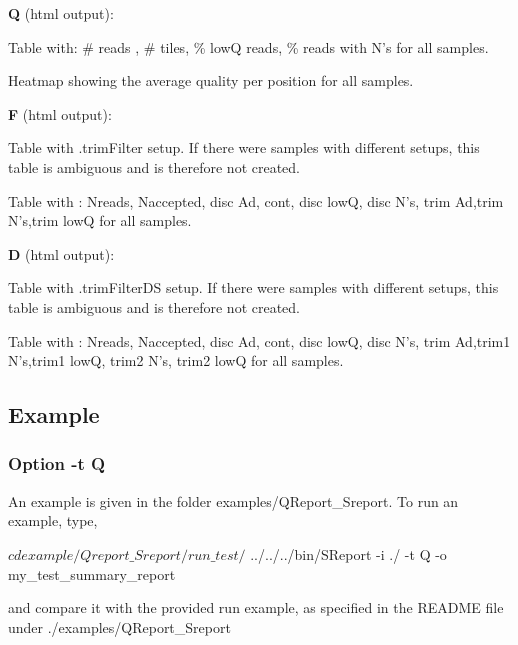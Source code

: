\begin{DoxyItemize}
\item {\bfseries Q} (html output)\+:
\begin{DoxyItemize}
\item Table with\+: {\ttfamily \# reads , \# tiles, \% lowQ reads, \% reads with N’s} for all samples.
\item Heatmap showing the average quality per position for all samples.
\end{DoxyItemize}
\item {\bfseries F} (html output)\+:
\begin{DoxyItemize}
\item Table with .trim\+Filter setup. If there were samples with different setups, this table is ambiguous and is therefore not created.
\item Table with \+: {\ttfamily Nreads}, {\ttfamily Naccepted}, {\ttfamily disc Ad}, {\ttfamily cont}, {\ttfamily disc lowQ}, {\ttfamily disc N’s}, {\ttfamily trim Ad},{\ttfamily trim N’s},{\ttfamily trim lowQ} for all samples.
\end{DoxyItemize}
\item {\bfseries D} (html output)\+:
\begin{DoxyItemize}
\item Table with .trim\+Filter\+DS setup. If there were samples with different setups, this table is ambiguous and is therefore not created.
\item Table with \+: {\ttfamily Nreads}, {\ttfamily Naccepted}, {\ttfamily disc Ad}, {\ttfamily cont}, {\ttfamily disc lowQ}, {\ttfamily disc N’s}, {\ttfamily trim Ad},{\ttfamily trim1 N’s},{\ttfamily trim1 lowQ}, {\ttfamily trim2 N’s}, {\ttfamily trim2 lowQ} for all samples.
\end{DoxyItemize}
\end{DoxyItemize}

\subsection*{Example}

\subsubsection*{Option {\ttfamily -\/t Q}}

An example is given in the folder {\ttfamily examples/\+Q\+Report\+\_\+\+Sreport}. To run an example, type,


\begin{DoxyCode}
$ cd example/Qreport\_Sreport/run\_test/
$ ../../../bin/SReport -i ./ -t Q -o my\_test\_summary\_report
\end{DoxyCode}
 and compare it with the provided run example, as specified in the R\+E\+A\+D\+ME file under {\ttfamily ./examples/\+Q\+Report\+\_\+\+Sreport}

